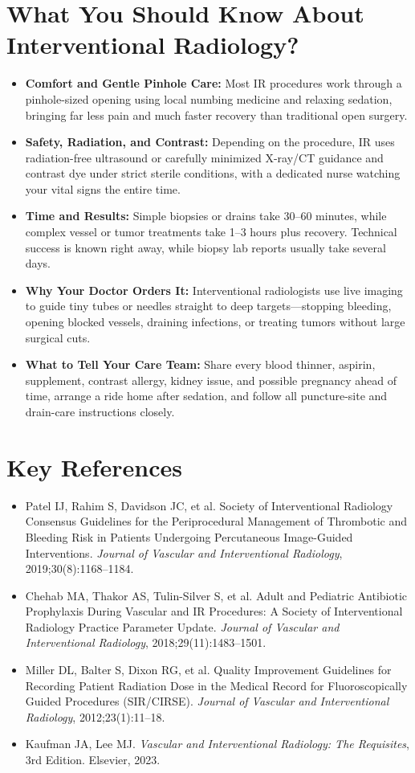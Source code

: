 \section{What You Should Know About Interventional Radiology?}

\begin{itemize}
    \item \textbf{Comfort and Gentle Pinhole Care:} Most IR procedures work through a pinhole-sized opening using local numbing medicine and relaxing sedation, bringing far less pain and much faster recovery than traditional open surgery.
    \item \textbf{Safety, Radiation, and Contrast:} Depending on the procedure, IR uses radiation-free ultrasound or carefully minimized X-ray/CT guidance and contrast dye under strict sterile conditions, with a dedicated nurse watching your vital signs the entire time.
    \item \textbf{Time and Results:} Simple biopsies or drains take 30--60 minutes, while complex vessel or tumor treatments take 1--3 hours plus recovery. Technical success is known right away, while biopsy lab reports usually take several days.
    \item \textbf{Why Your Doctor Orders It:} Interventional radiologists use live imaging to guide tiny tubes or needles straight to deep targets---stopping bleeding, opening blocked vessels, draining infections, or treating tumors without large surgical cuts.
    \item \textbf{What to Tell Your Care Team:} Share every blood thinner, aspirin, supplement, contrast allergy, kidney issue, and possible pregnancy ahead of time, arrange a ride home after sedation, and follow all puncture-site and drain-care instructions closely.
\end{itemize}

\section{Key References}

\begin{itemize}
    \item Patel IJ, Rahim S, Davidson JC, et al. Society of Interventional Radiology Consensus Guidelines for the Periprocedural Management of Thrombotic and Bleeding Risk in Patients Undergoing Percutaneous Image-Guided Interventions. \textit{Journal of Vascular and Interventional Radiology}, 2019;30(8):1168--1184.
    \item Chehab MA, Thakor AS, Tulin-Silver S, et al. Adult and Pediatric Antibiotic Prophylaxis During Vascular and IR Procedures: A Society of Interventional Radiology Practice Parameter Update. \textit{Journal of Vascular and Interventional Radiology}, 2018;29(11):1483--1501.
    \item Miller DL, Balter S, Dixon RG, et al. Quality Improvement Guidelines for Recording Patient Radiation Dose in the Medical Record for Fluoroscopically Guided Procedures (SIR/CIRSE). \textit{Journal of Vascular and Interventional Radiology}, 2012;23(1):11--18.
    \item Kaufman JA, Lee MJ. \textit{Vascular and Interventional Radiology: The Requisites}, 3rd Edition. Elsevier, 2023.
\end{itemize}
